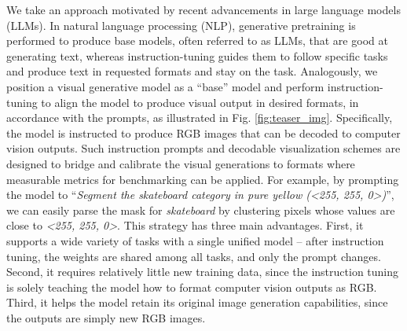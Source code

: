 \documentclass[11pt, a4paper, copyright, gdm]{google}
\begin{document}
We take an approach motivated by recent advancements in large language models (LLMs). In natural language processing (NLP), generative pretraining \citep{brown2020language_gpt3,chowdhery2023palm} is performed to produce base models, often referred to as LLMs, that are good at generating text, whereas instruction-tuning \citep{ouyang2022training_instructgpt,wei2021finetuned_flan} guides them to follow specific tasks and produce text in requested formats and stay on the task.
Analogously, we position a visual generative model as a ``base'' model and perform instruction-tuning to align the model to produce visual output in desired formats, in accordance with the prompts, as illustrated in Fig. \ref{fig:teaser_img}.
Specifically, the model is instructed to produce RGB images that can be decoded to computer vision outputs. 
Such instruction prompts and decodable visualization schemes are designed to bridge and calibrate the visual generations to formats where measurable metrics for benchmarking can be applied.
For example, by prompting the model to ``\textit{Segment the skateboard category in pure yellow (<255, 255, 0>)}'', we can easily parse the mask for \textit{skateboard} by clustering pixels whose values are close to \textit{<255, 255, 0>}.
This strategy has three main advantages.
First, it supports a wide variety of tasks with a single unified model -- after instruction tuning, the weights are shared among all tasks, and only the prompt changes.   
Second, it requires relatively little new training data, since the instruction tuning is solely teaching the model how to format computer vision outputs as RGB.
Third, it helps the model retain its original image generation capabilities, since the outputs are simply new RGB images.
\end{document}
